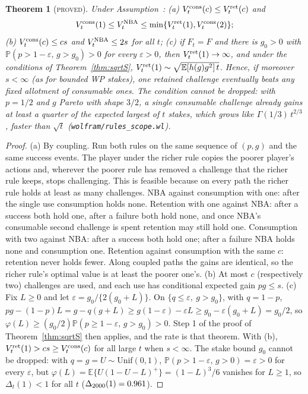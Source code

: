 \documentclass[aoas]{imsart}
\theoremstyle{plain}
\newtheorem{theorem}{Theorem}
\theoremstyle{definition}
\newcommand{\E}{\mathbb{E}}
\newcommand{\Prob}{\mathbb{P}}
\newcommand{\tstatus}[1]{\textup{\textsc{#1}}}
\begin{document}
\begin{theorem}[\tstatus{proved}]\label{thm:rules}
Under Assumption~:
(a) $V^{\rm cons}_t(c)\le V^{\rm ret}_t(c)$ and
\[ V^{\rm cons}_t(1)\le V^{\rm NBA}_t\le\min\{V^{\rm ret}_t(1),V^{\rm cons}_t(2)\}; \]
(b) $V^{\rm cons}_t(c)\le cs$ and $V^{\rm NBA}_t\le2s$ for all $t$;
(c) if $F_t=F$ and there is $g_0>0$ with $\Prob(p>1-\varepsilon,\,g>g_0)>0$ for every $\varepsilon>0$, then
$V^{\rm ret}_t(1)\to\infty$, and
under the conditions of Theorem~\ref{thm:sqrtS}, $V^{\rm ret}_t(1)\sim\sqrt{\E[h(g)g^2]\,t}$. Hence, if moreover $s<\infty$ (as for bounded WP stakes), one
retained challenge eventually beats any fixed allotment of consumable ones. The condition cannot be dropped: with
$p=1/2$ and $g$ Pareto with shape $3/2$, a single consumable challenge already gains at least a quarter of the expected
largest of $t$ stakes, which grows like $\Gamma(1/3)\,t^{2/3}$, faster than $\sqrt t$
(\texttt{wolfram/rules\_scope.wl}).
\end{theorem}
\begin{proof}
(a) By coupling. Run both rules on the same sequence of $(p,g)$ and the same success events. The player under the
richer rule copies the poorer player's actions and, wherever the poorer rule has removed a challenge that the richer
rule keeps, stops challenging. This is feasible because on every path the richer rule holds at least as many
challenges. NBA against consumption with one: after the single use consumption holds none. Retention with one against
NBA: after a success both hold one, after a failure both hold none, and once NBA's consumable second challenge is spent
retention may still hold one. Consumption with two against NBA: after a success both hold one; after a failure NBA
holds none and consumption one. Retention against consumption with the same $c$: retention never holds fewer. Along
coupled paths the gains are identical, so the richer rule's optimal value is at least the poorer one's.
(b) At most $c$ (respectively two) challenges are used, and each use has conditional expected gain $pg\le s$.
(c) Fix $L\ge0$ and let $\varepsilon=g_0/\{2(g_0+L)\}$. On $\{q\le\varepsilon,\ g>g_0\}$, with $q=1-p$,
$pg-(1-p)L=g-q(g+L)\ge g(1-\varepsilon)-\varepsilon L\ge g_0-\varepsilon(g_0+L)=g_0/2$, so
$\varphi(L)\ge(g_0/2)\Prob(p\ge1-\varepsilon,\,g>g_0)>0$. Step 1 of the proof of Theorem~\ref{thm:sqrtS} then applies,
and the rate is that theorem. With (b), $V^{\rm ret}_t(1)>cs\ge V^{\rm cons}_t(c)$ for all large $t$ when $s<\infty$. The stake bound
$g_0$ cannot be dropped: with $q=g=U\sim\mathrm{Unif}(0,1)$, $\Prob(p>1-\varepsilon,\,g>0)=\varepsilon>0$ for every
$\varepsilon$, but $\varphi(L)=\E\{U(1-U-L)^+\}=(1-L)^3/6$ vanishes for $L\ge1$, so $\Delta_t(1)<1$ for all $t$
($\Delta_{2000}(1)=0.961$).
\end{proof}
\end{document}
